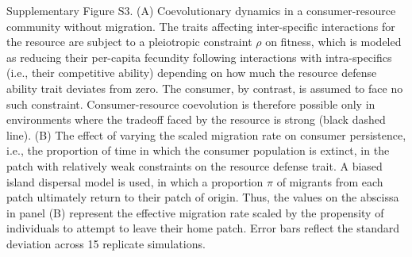 \documentclass[11pt]{article}
\begin{document}
Supplementary Figure S3. (A) Coevolutionary dynamics in a consumer-resource community without migration. The traits affecting inter-specific interactions for the resource are subject to a pleiotropic constraint $\rho$ on fitness, which is modeled as reducing their per-capita fecundity following interactions with intra-specifics (i.e., their competitive ability) depending on how much the resource defense ability trait deviates from zero. The consumer, by contrast, is assumed to face no such constraint. Consumer-resource coevolution is therefore possible only in environments where the tradeoff faced by the resource is strong (black dashed line). (B) The effect of varying the scaled migration rate on consumer persistence, i.e., the proportion of time in which the consumer population is extinct, in the patch with relatively weak constraints on the resource defense trait. A biased island dispersal model is used, in which a proportion $\pi$ of migrants from each patch ultimately return to their patch of origin. Thus, the values on the abscissa in panel (B) represent the effective migration rate scaled by the propensity of individuals to attempt to leave their home patch. Error bars reflect the standard deviation across 15 replicate simulations. 
\end{document}
